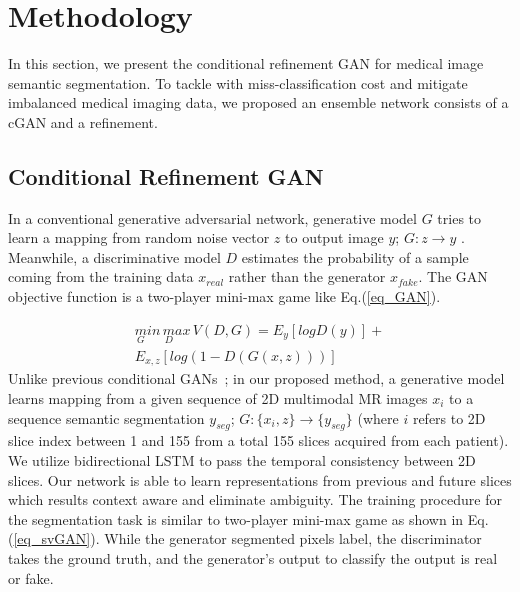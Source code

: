 \documentclass[10pt,twocolumn,letterpaper]{article}
\begin{document}
\section{Methodology}\label{methodology}
In this section, we present the conditional refinement GAN for medical image semantic segmentation. To tackle with miss-classification cost and mitigate imbalanced medical imaging data, we proposed an ensemble network consists of a cGAN and a refinement.

\subsection{Conditional Refinement GAN}\label{CRGAN}
In a conventional generative adversarial network, generative model $G$ tries to learn a mapping from random noise vector $z$ to output image $y$; $G: z \rightarrow y$ .
Meanwhile, a discriminative model $D$ estimates the probability of a sample coming from the training data $x_{real}$ rather than the generator $x_{fake}$.
The GAN objective function is a two-player mini-max game like Eq.(\ref{eq_GAN}).

\begin{equation} \label{eq_GAN}
\begin{split}
 \underset{G} min \,  \underset{D } max \, V(D, G)
   = E_{y} [log D(y)] + \\
     E_{x,z} [log (1-D(G(x,z)))]
\end{split}
\end{equation}%
Unlike previous conditional GANs~\cite{MirzaO14,Phillipimagetoimage2017,XueXZLH17,Moeskops2017,KohlBSYHHRM17}; in our proposed method, a generative model learns mapping from a given sequence of 2D multimodal MR images $x_i$ to a sequence semantic segmentation $y_{seg}$; $G : \{x_i,z\} \rightarrow \{y_{seg}\}$ (where $i$ refers to 2D slice index between 1 and 155 from a total 155 slices acquired from each patient).
We utilize bidirectional LSTM to pass the temporal consistency between 2D slices. Our network is able to learn representations from previous and future slices which results context aware and eliminate ambiguity.
The training procedure for the segmentation task is similar to two-player mini-max game as shown in Eq.(\ref{eq_svGAN}).
While the generator segmented pixels label, the discriminator takes the ground truth, and the generator's output to classify the output is real or fake.
\end{document}
